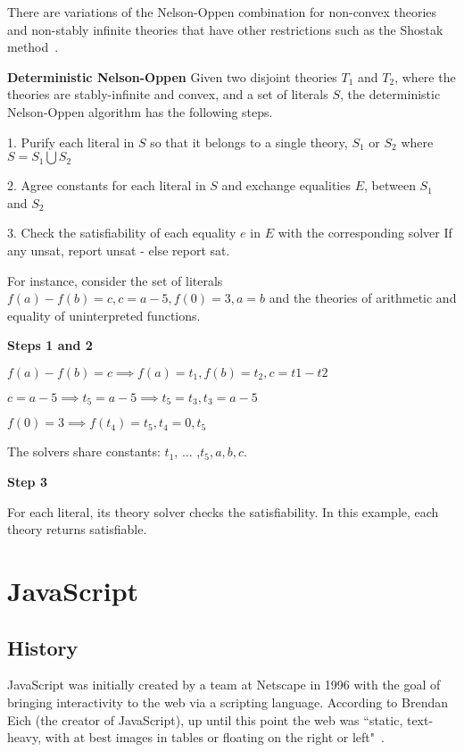 \documentclass[]{final_report}
\begin{document}
There are variations of the Nelson-Oppen combination for non-convex theories and non-stably infinite theories that have other restrictions such as the Shostak method~\cite{manna2003combining}.

\textbf{Deterministic Nelson-Oppen}
Given two disjoint theories $T_1$ and $T_2$, where the theories are stably-infinite and convex, and a set of literals $S$, the deterministic Nelson-Oppen algorithm has the following steps.

1. Purify each literal in $S$ so that it belongs to a single theory, $S_1$ or $S_2$ where $S = S_1 \bigcup S_2$

2. Agree constants for each literal in $S$ and exchange equalities $E$, between $S_1$ and $S_2$

3. Check the satisfiability of each equality $e$ in $E$ with the corresponding solver If any unsat, report unsat - else report sat.

For instance, consider the set of literals $f(a) - f(b) = c, c = a -5, f(0) = 3, a = b$ and the theories of arithmetic and equality of uninterpreted functions.

\textbf{Steps 1 and 2}

$f(a) - f(b) = c \implies f(a) = t_1, f(b) = t_2, c = t1 - t2$

$c = a - 5 \implies t_5 = a - 5 \implies t_5 = t_3, t_3 = a- 5$

$f(0) =3 \implies f(t_4) = t_5, t_4 = 0, t_5$

The solvers share constants: $t_1$, ... ,$t_5, a, b, c$.

\textbf{Step 3}

For each literal, its theory solver checks the satisfiability. In this example, each theory returns satisfiable.

\chapter{JavaScript}

\section{History}

JavaScript was initially created by a team at Netscape in 1996 with the goal of bringing interactivity to the web via a scripting language. According to Brendan Eich (the creator of JavaScript), up until this point the web was ``static, text-heavy, with at best images in tables or floating on the right or left"~\cite{AZProgrammingLanguages}. 
\end{document}
